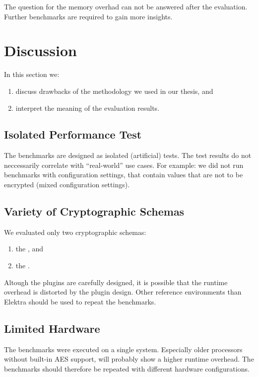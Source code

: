 The question for the memory overhad can not be answered after the evaluation.
Further benchmarks are required to gain more insights.

\section{Discussion}

In this section we:
\begin{enumerate}
\item discuss drawbacks of the methodology we used in our thesis, and
\item interpret the meaning of the evaluation results.
\end{enumerate}

	\subsection{Isolated Performance Test}

The benchmarks are designed as isolated (artificial) tests.
The test results do not neccessarily correlate with ``real-world'' use cases.
For example: we did not run benchmarks with configuration settings, that contain values that are not to be encrypted (mixed configuration settings).

	\subsection{Variety of Cryptographic Schemas}

We evaluated only two cryptographic schemas:
\begin{enumerate}
\item the \crypto, and
\item the \fcrypt.
\end{enumerate}

Altough the plugins are carefully designed, it is possible that the runtime overhead is distorted by the plugin design.
Other reference environments than Elektra should be used to repeat the benchmarks.

	\subsection{Limited Hardware}

The benchmarks were executed on a single system.
Especially older processors without built-in AES support, will probably show a higher runtime overhead.
The benchmarks should therefore be repeated with different hardware configurations.

